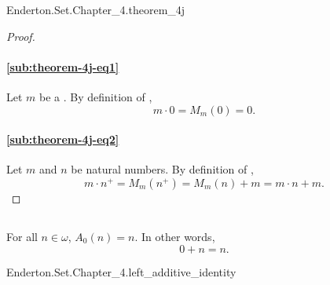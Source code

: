 \documentclass{report}
\begin{document}
    {Enderton.Set.Chapter\_4.theorem\_4j}



  \begin{proof}

    \paragraph{\eqref{sub:theorem-4j-eq1}}%

      Let $m$ be a .
      By definition of , $$m \cdot 0 = M_m(0) = 0.$$

    \paragraph{\eqref{sub:theorem-4j-eq2}}%

      Let $m$ and $n$ be natural numbers.
      By definition of ,
        $$m \cdot n^+ = M_m(n^+) = M_m(n) + m = m \cdot n + m.$$

  \end{proof}

\subsection{}%

  \begin{lemma}
    For all $n \in \omega$, $A_0(n) = n$.
    In other words, $$0 + n = n.$$
  \end{lemma}

    {Enderton.Set.Chapter\_4.left\_additive\_identity}

\end{document}
